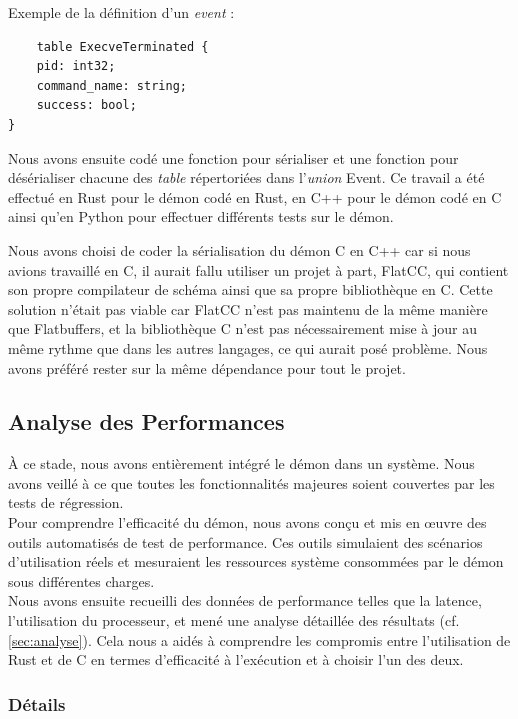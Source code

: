\documentclass{article}
\begin{document}
\noindent Exemple de la définition d'un \textit{event} : 

\begin{verbatim}
    table ExecveTerminated {
    pid: int32;
    command_name: string;
    success: bool;
}
\end{verbatim}

Nous avons ensuite codé une fonction pour sérialiser et une fonction pour désérialiser chacune des \textit{table} répertoriées dans l'\textit{union} Event. Ce travail a été effectué en Rust pour le démon codé en Rust, en C++ pour le démon codé en C ainsi qu'en Python pour effectuer différents tests sur le démon. 

Nous avons choisi de coder la sérialisation du démon C en C++ car si nous avions travaillé en C, il aurait fallu utiliser un projet à part, FlatCC, qui contient son propre compilateur de schéma ainsi que sa propre bibliothèque en C. Cette solution n'était pas viable car FlatCC n'est pas maintenu de la même manière que Flatbuffers, et la bibliothèque C n'est pas nécessairement mise à jour au même rythme que dans les autres langages, ce qui aurait posé problème. Nous avons préféré rester sur la même dépendance pour tout le projet.

\subsection{Analyse des Performances}

À ce stade, nous avons entièrement intégré le démon dans un système. Nous avons veillé à ce que toutes les fonctionnalités majeures soient couvertes par les tests de régression.\\

Pour comprendre l’efficacité du démon, nous avons conçu et mis en œuvre des outils automatisés de test de performance. Ces outils simulaient des scénarios d’utilisation réels et mesuraient les ressources système consommées par le démon sous différentes charges.\\

Nous avons ensuite recueilli des données de performance telles que la latence, l’utilisation du processeur, et mené une analyse détaillée des résultats (cf. \ref{sec:analyse}). Cela nous a aidés à comprendre les compromis entre l'utilisation de Rust et de C en termes d’efficacité à l'exécution et à choisir l’un des deux.

\subsubsection{Détails}
\end{document}
